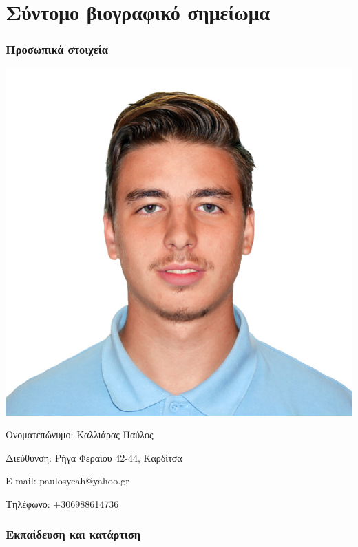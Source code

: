 \section{Σύντομο βιογραφικό
σημείωμα}\label{ux3c3ux3cdux3bdux3c4ux3bfux3bcux3bf-ux3b2ux3b9ux3bfux3b3ux3c1ux3b1ux3c6ux3b9ux3baux3cc-ux3c3ux3b7ux3bcux3b5ux3afux3c9ux3bcux3b1}

\subsubsection{Προσωπικά
στοιχεία}\label{ux3c0ux3c1ux3bfux3c3ux3c9ux3c0ux3b9ux3baux3ac-ux3c3ux3c4ux3bfux3b9ux3c7ux3b5ux3afux3b1}

\includegraphics{photo.jpg}

Ονοματεπώνυμο: Καλλιάρας Παύλος

Διεύθυνση: Ρήγα Φεραίου 42-44, Καρδίτσα

E-mail: paulosyeah@yahoo.gr

Τηλέφωνο: +306988614736

\subsubsection{Εκπαίδευση και
κατάρτιση}\label{ux3b5ux3baux3c0ux3b1ux3afux3b4ux3b5ux3c5ux3c3ux3b7-ux3baux3b1ux3b9-ux3baux3b1ux3c4ux3acux3c1ux3c4ux3b9ux3c3ux3b7}

